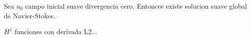 \documentclass{article}
\begin{document}
\begin{theorem}
Sea $u_0$ campo inicial suave divergencia cero. Entonces existe solucion suave global de Navier-Stokes.
\end{theorem}
\begin{definition}[Sobolev H1]
$H^1$ funciones con derivada L2...
\end{definition}
\end{document}
